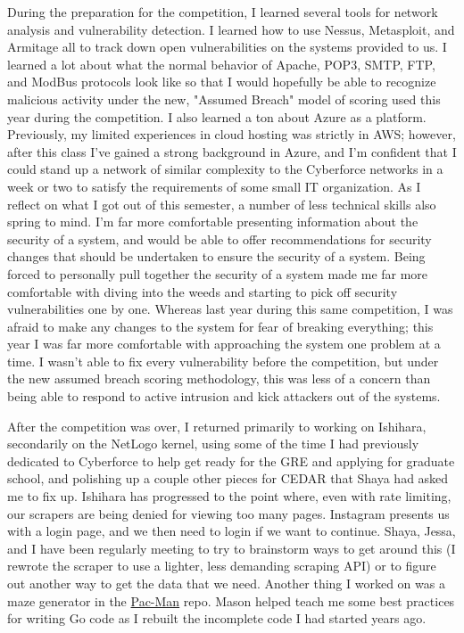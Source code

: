 During the preparation for the competition, I learned several tools for network analysis and vulnerability detection. I learned how to use Nessus, Metasploit, and Armitage all to track down open vulnerabilities on the systems provided to us. I learned a lot about what the normal behavior of Apache, POP3, SMTP, FTP, and ModBus protocols look like so that I would hopefully be able to recognize malicious activity under the new, "Assumed Breach" model of scoring used this year during the competition. I also learned a ton about Azure as a platform. Previously, my limited experiences in cloud hosting was strictly in AWS; however, after this class I've gained a strong background in Azure, and I'm confident that I could stand up a network of similar complexity to the Cyberforce networks in a week or two to satisfy the requirements of some small IT organization. As I reflect on what I got out of this semester, a number of less technical skills also spring to mind. I'm far more comfortable presenting information about the security of a system, and would be able to offer recommendations for security changes that should be undertaken to ensure the security of a system. Being forced to personally pull together the security of a system made me far more comfortable with diving into the weeds and starting to pick off security vulnerabilities one by one. Whereas last year during this same competition, I was afraid to make any changes to the system for fear of breaking everything; this year I was far more comfortable with approaching the system one problem at a time. I wasn't able to fix every vulnerability before the competition, but under the new assumed breach scoring methodology, this was less of a concern than being able to respond to active intrusion and kick attackers out of the systems.

\vspace{7mm}

After the competition was over, I returned primarily to working on Ishihara, secondarily on the NetLogo kernel, using some of the time I had previously dedicated to Cyberforce to help get ready for the GRE and applying for graduate school, and polishing up a couple other pieces for CEDAR that Shaya had asked me to fix up. Ishihara has progressed to the point where, even with rate limiting, our scrapers are being denied for viewing too many pages. Instagram presents us with a login page, and we then need to login if we want to continue. Shaya, Jessa, and I have been regularly meeting to try to brainstorm ways to get around this (I rewrote the scraper to use a lighter, less demanding scraping API) or to figure out another way to get the data that we need. Another thing I worked on was a maze generator in the \href{https://uwcedar.io/Research/ARCADE/base-maze-logic}{Pac-Man} repo. Mason helped teach me some best practices for writing Go code as I rebuilt the incomplete code I had started years ago.

